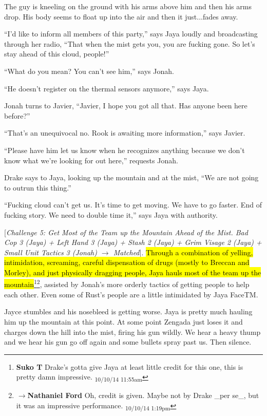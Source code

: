 The guy is kneeling on the ground with his arms above him and then his arms drop.  His body seems to float up into the air and then it just...fades away.

``I'd like to inform all members of this party,'' says Jaya loudly and broadcasting through her radio, ``That when the mist gets you, you are fucking gone.  So let's stay ahead of this cloud, people!''

``What do you mean?  You can't see him,'' says Jonah.

``He doesn't register on the thermal sensors anymore,'' says Jaya.

Jonah turns to Javier, ``Javier, I hope you got all that.  Has anyone been here before?''

``That's an unequivocal no.  Rook is awaiting more information,'' says Javier.

``Please have him let us know when he recognizes anything because we don't know what we're looking for out here,'' requests Jonah.

Drake says to Jaya, looking up the mountain and at the mist, ``We are not going to outrun this thing.''

``Fucking cloud can't get us. It's time to get moving.  We have to go faster.  End of fucking story.  We need to double time it,'' says Jaya with authority.



{[}\textit{Challenge 5: Get Most of the Team up the Mountain Ahead of the Mist.  Bad Cop 3 (Jaya) + Left Hand 3 (Jaya) + Stash 2 (Jaya) + Grim Visage 2 (Jaya) + Small Unit Tactics 3 (Jonah) $\rightarrow$ Matched}{]}.  \hl{Through a combination of yelling, intimidation, screaming, careful dispensation of drugs (mostly to Breccan and Morley), and just physically dragging people, Jaya hauls most of the team up the mountain}\footnote{\textbf{Suko T }Drake's gotta give Jaya at least little credit for this one, this is pretty damn impressive. \textsubscript{10/10/14 11:55am}}\footnote{$\rightarrow$\textbf{Nathaniel Ford }Oh, credit is given. Maybe not by Drake \_per se\_, but it was an impressive performance. \textsubscript{10/10/14 1:19pm}}, assisted by Jonah's more orderly tactics of getting people to help each other.  Even some of Rust's people are a little intimidated by Jaya FaceTM.



Jayce stumbles and his nosebleed is getting worse.  Jaya is pretty much hauling him up the mountain at this point.   At some point Zengada just loses it and charges down the hill into the mist, firing his gun wildly.  We hear a heavy thump and we hear his gun go off again and some bullets spray past us. Then silence.  

